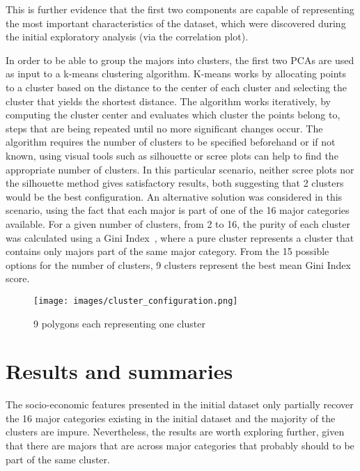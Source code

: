 \documentclass[11pt]{article}
\begin{document}
This is further evidence that the first two components are capable of representing the most important characteristics of the dataset, which were discovered during the initial exploratory analysis (via the correlation plot).

In order to be able to group the majors into clusters, the first two PCAs are used as input to a k-means clustering algorithm. K-means works by allocating points to a cluster based on the distance to the center of each cluster and selecting the cluster that yields the shortest distance. The algorithm works iteratively, by computing the cluster center and evaluates which cluster the points belong to, steps that are being repeated until no more significant changes occur. The algorithm requires the number of clusters to be specified beforehand or if not known, using visual tools such as silhouette or scree plots can help to find the appropriate number of clusters. In this particular scenario, neither scree plots nor the silhouette method gives satisfactory results, both suggesting that 2 clusters would be the best configuration. An alternative solution was considered in this scenario, using the fact that each major is part of one of the 16 major categories available. For a given number of clusters, from 2 to 16, the purity of each cluster was calculated using a Gini Index~\cite{giniindex}, where a pure cluster represents a cluster that contains only majors part of the same major category. From the 15 possible options for the number of clusters, 9 clusters represent the best mean Gini Index score.

\begin{figure} [H]
    \begin{center}
        \texttt{[image: images/cluster\_configuration.png]}
        \caption{9 polygons each representing one cluster}
        \label{fig:clusters}
    \end{center}
\end{figure}

\section*{Results and summaries} 

The socio-economic features presented in the initial dataset only partially recover the 16 major categories existing in the initial dataset and the majority of the clusters are impure. Nevertheless, the results are worth exploring further, given that there are majors that are across major categories that probably should to be part of the same cluster.
\end{document}
